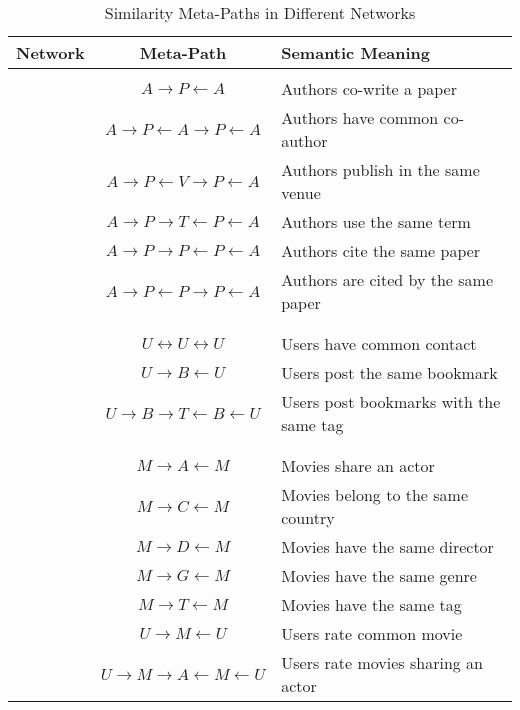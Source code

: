 \begin{table}[t]
	\centering
	\caption{Similarity Meta-Paths in Different Networks}
	\label{table:meta}
	\footnotesize
	\begin{tabular} {c c l}
		\toprule
		Network & Meta-Path & Semantic Meaning \\
		\midrule
		\multirow{8}{*}{\rotatebox{90}{DBLP}} 
		&&\\
		& $A\rightarrow P\leftarrow A$ & Authors co-write a paper\\
		& $A\rightarrow P\leftarrow A\rightarrow P\leftarrow A$ & Authors have common co-author\\
		& $A\rightarrow P\leftarrow V\rightarrow P\leftarrow A$ & Authors publish in the same venue\\
		& $A\rightarrow P\rightarrow T\leftarrow P\leftarrow A$ & Authors use the same term\\
		& $A\rightarrow P\rightarrow P\leftarrow P\leftarrow A$ & Authors cite the same paper\\
		& $A\rightarrow P\leftarrow P\rightarrow P\leftarrow A$ & Authors are cited by the same paper\\
		&&\\
		\midrule
		\multirow{5}{*}{\rotatebox{90}{Delicious}} 
		&&\\
		& $U\leftrightarrow U\leftrightarrow U$ & Users have common contact\\
		& $U\rightarrow B\leftarrow U$ & Users post the same bookmark\\
		& $U\rightarrow B\rightarrow T\leftarrow B\leftarrow U$ & Users post bookmarks with the same tag\\
		&&\\
		\midrule
		\multirow{13}{*}{\rotatebox{90}{MovieLens}} 
		&&\\
		& $M\rightarrow A\leftarrow M$ & Movies share an actor\\
		& $M\rightarrow C\leftarrow M$ & Movies belong to the same country\\
		& $M\rightarrow D\leftarrow M$ & Movies have the same director\\
		& $M\rightarrow G\leftarrow M$ & Movies have the same genre\\
		& $M\rightarrow T\leftarrow M$ & Movies have the same tag\\
		& $U\rightarrow M\leftarrow U$ & Users rate common movie\\
		& $U\rightarrow M\rightarrow A\leftarrow M\leftarrow U$ & Users rate movies sharing an actor\\

\end{tabular}
\end{table}
